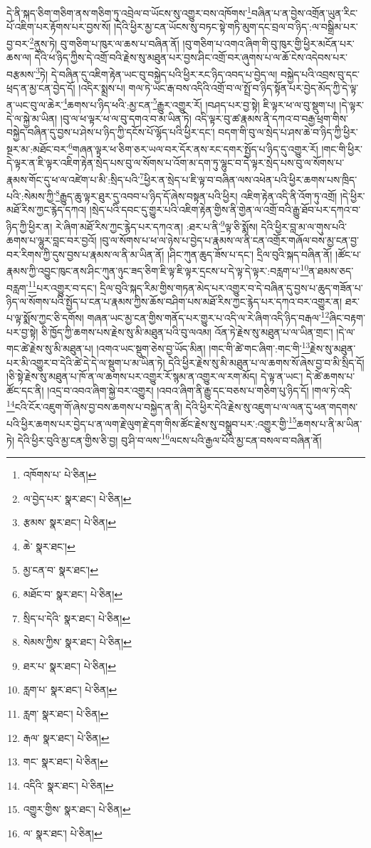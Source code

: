 དེ་ནི་སྐད་ཅིག་གཅིག་ནས་གཅིག་ཏུ་འབྲེལ་བ་ཡོངས་སུ་འགྱུར་བས་འཁོགས་\footnote{འཁོགས་པ་  པེ་ཅིན། }བཞིན་པ་ན་བྱེས་འགྲོན་ཡུན་རིང་པོ་འཇིག་པར་རྟོགས་པར་བྱས་སོ། །དེའི་ཕྱིར་མྱ་ངན་ཡོངས་སུ་བཏང་སྟེ་གཏི་མུག་དང་བྲལ་བ་ཉིད་:ལ་བསྒྲིམ་པར་བྱ་བར་\footnote{ལ་བྱེད་པར་  སྣར་ཐང་།  པེ་ཅིན། }ནུས་ཏེ། བུ་གཅིག་པ་ཁུར་ལ་ཆས་པ་བཞིན་ནོ། །བུ་གཅིག་པ་འགའ་ཞིག་གི་བུ་ཁུར་གྱི་ཕྱིར་མངོན་པར་ཆས་ལ། དེའི་ཕ་ཉིད་ཀྱིས་དེ་འགྲོ་བའི་རྗེས་སུ་མཐུན་པར་བྱས་ཤིང་འགྲོ་བར་ཞུགས་པ་ལ་ཆོ་ངེས་འདེབས་པར་བརྩམས་\footnote{རྩམས་  སྣར་ཐང་།  པེ་ཅིན། }ཏེ། དེ་བཞིན་དུ་འཇིག་རྟེན་ཡང་བུ་བསྐྱེད་པའི་ཕྱིར་རང་ཉིད་འབད་པ་བྱེད་ལ། བསྐྱེད་པའི་འབྲས་བུ་དང་ཕྲད་ན་མྱ་ངན་བྱེད་དོ། །འདིར་སྨྲས་པ། གལ་ཏེ་ཡང་རྒ་བས་འདིའི་འགྲོ་བ་ལ་སྤྲོ་བ་ཉིད་སྟོན་པར་བྱེད་མོད་ཀྱི་དེ་ལྟ་ན་ཡང་བུ་ལ་ཆེར་\footnote{ཆེ་  སྣར་ཐང་། }ཆགས་པ་ཉིད་ཕའི་:མྱ་ངན་\footnote{མྱ་ངན་བ་  སྣར་ཐང་། }རྒྱུར་འགྱུར་རོ། །བཤད་པར་བྱ་སྟེ། ཇི་ལྟར་ཕ་ལ་བུ་སྡུག་པ། །དེ་ལྟར་དེ་ལ་སྐྱེ་མ་ཡིན། །བུ་ལ་ཕ་ལྟར་ཕ་ལ་བུ་དགའ་བ་མ་ཡིན་ཏེ། འདི་ལྟར་བུ་ཚ་རྣམས་ནི་དཀའ་བ་བརྒྱ་ཕྲག་གིས་བསྐྱེད་བཞིན་དུ་བྱས་པ་ཤེས་པ་ཉིད་ཀྱི་དངོས་པོ་ལྷོད་པའི་ཕྱིར་དང་། བདག་གི་བུ་ལ་སྲེད་པ་ཤས་ཆེ་བ་ཉིད་ཀྱི་ཕྱིར་སྔར་མ་:མཐོང་བར་\footnote{མཐོང་བ་  སྣར་ཐང་།  པེ་ཅིན། }གཞན་ལྟར་ཕ་ཅིག་ཅར་ཡལ་བར་དོར་ནས་རང་དགར་སྤྱོད་པ་ཉིད་དུ་འགྱུར་རོ། །གང་གི་ཕྱིར་དེ་ལྟར་ན་ཇི་ལྟར་འཇིག་རྟེན་སྲེད་པས་བུ་ལ་སོགས་པ་འོག་མ་དག་ཏུ་ལྷུང་བ་དེ་ལྟར་སྲེད་པས་བུ་ལ་སོགས་པ་རྣམས་གོང་དུ་ཕ་ལ་འཛེག་པ་མི་:སྲིད་པའི་\footnote{སྲིད་པ་དེའི་  སྣར་ཐང་།  པེ་ཅིན། }ཕྱིར་ན་སྲེད་པ་ཇི་ལྟ་བ་བཞིན་ལས་འཕེན་པའི་ཕྱིར་ཆགས་པས་ཁྲིད་པའི་:སེམས་ཀྱི་\footnote{སེམས་ཀྱིས་  སྣར་ཐང་།  པེ་ཅིན། }རྒྱུད་ཆུ་ལྟར་ཐུར་དུ་འབབ་པ་ཉིད་དོ་ཞེས་བསྟན་པའི་ཕྱིར། འཇིག་རྟེན་འདི་ནི་འོག་ཏུ་འགྲོ། །དེ་ཕྱིར་མཐོ་རིས་ཀྱང་རྙེད་དཀའ། །སྲེད་པའི་དབང་དུ་གྱུར་པའི་འཇིག་རྟེན་གྱིས་ནི་གྱེན་ལ་འགྲོ་བའི་རྒྱུ་ཐོབ་པར་དཀའ་བ་ཉིད་ཀྱི་ཕྱིར་ན། རེ་ཞིག་མཐོ་རིས་ཀྱང་རྙེད་པར་དཀའ་ན། :ཐར་པ་ནི་\footnote{ཐར་པ་  སྣར་ཐང་།  པེ་ཅིན། }ལྟ་ཅི་སྨོས། དེའི་ཕྱིར་བླ་མ་ལ་གུས་པའི་ཆགས་པ་ལྷུར་བླང་བར་བྱའོ། །བུ་ལ་སོགས་པ་ཕ་ལ་ཉེས་པ་བྱེད་པ་རྣམས་ལ་ནི་ངན་འགྲོར་གཞོལ་བས་མྱ་ངན་བྱ་བར་རིགས་ཀྱི་དུས་བྱས་པ་རྣམས་ལ་ནི་མ་ཡིན་ནོ། །ཤིང་ཀུན་ཆུད་ཟོས་པ་དང་། དྲིལ་བུའི་སྐད་བཞིན་ནོ། །ཚོང་པ་རྣམས་ཀྱི་འབྱུང་ཁུང་ནས་ཤིང་ཀུན་ཉུང་ཟད་ཅིག་ཇི་ལྟ་ཇི་ལྟར་དྲངས་པ་དེ་ལྟ་དེ་ལྟར་:བརླག་པ་\footnote{རླག་པ་  སྣར་ཐང་།  པེ་ཅིན། }ན་ཐམས་ཅད་བརླག་\footnote{རླག་  སྣར་ཐང་།  པེ་ཅིན། }པར་འགྱུར་བ་དང་། དྲིལ་བུའི་སྐད་རིམ་གྱིས་གཏན་མེད་པར་འགྱུར་བ་དེ་བཞིན་དུ་བྱས་པ་ཆུད་གཟོན་པ་ཉིད་ལ་སོགས་པའི་སྤྱོད་པ་ངན་པ་རྣམས་ཀྱིས་ཆོས་བཤིག་པས་མཐོ་རིས་ཀྱང་རྙེད་པར་དཀའ་བར་འགྱུར་ན། ཐར་པ་ལྟ་སྨོས་ཀྱང་ཅི་དགོས། གཞན་ཡང་མྱ་ངན་གྱིས་གནོད་པར་གྱུར་པ་འདི་ལ་རེ་ཞིག་འདི་ཉིད་བརྒལ་\footnote{རྒལ་  སྣར་ཐང་།  པེ་ཅིན། }ཞིང་བརྟག་པར་བྱ་སྟེ། ཅི་ཁྱོད་ཀྱི་ཆགས་པས་རྗེས་སུ་མི་མཐུན་པའི་བུ་ལའམ། འོན་ཏེ་རྗེས་སུ་མཐུན་པ་ལ་ཡིན་གྲང་། །དེ་ལ་གང་ཚེ་རྗེས་སུ་མི་མཐུན་པ། །འགའ་ཡང་སྡུག་ཅེས་བྱ་ཡོད་མིན། །གང་གི་ཚེ་གང་ཞིག་:གང་གི་\footnote{གང་  སྣར་ཐང་།  པེ་ཅིན། }རྗེས་སུ་མཐུན་པར་མི་འགྱུར་བ་དེའི་ཚེ་དེ་དེ་ལ་སྡུག་པ་མ་ཡིན་ཏེ། དེའི་ཕྱིར་རྗེས་སུ་མི་མཐུན་པ་ལ་ཆགས་སོ་ཞེས་བྱ་བ་མི་སྲིད་དོ། །ཅི་སྟེ་རྗེས་སུ་མཐུན་པ་ཁོ་ན་ལ་ཆགས་པར་འགྱུར་རོ་སྙམ་ན་འགྱུར་ལ་རག་མོད། དེ་ལྟ་ན་ཡང་། དེ་ཚེ་ཆགས་པ་ཚོང་དང་ནི། །འདྲ་བ་འབའ་ཞིག་སྐྱེ་བར་འགྱུར། །འབའ་ཞིག་ནི་རྒྱུ་དང་བཅས་པ་གཅིག་པུ་ཉིད་དོ། །གལ་ཏེ་འདི་\footnote{འདིའི་  སྣར་ཐང་།  པེ་ཅིན། }ངའི་ངོར་འཇུག་གོ་ཞེས་བྱ་བས་ཆགས་པ་བསྐྱེད་ན་ནི། དེའི་ཕྱིར་དེའི་རྗེས་སུ་འཇུག་པ་ལ་ལན་དུ་ཕན་གདགས་པའི་ཕྱིར་ཆགས་པར་བྱེད་པ་ན་ལག་རྗེ་ལུག་རྗེ་དག་གིས་ཚོང་རྗེས་སུ་བསྒྲུབ་པར་:འགྱུར་གྱི་\footnote{འགྱུར་གྱིས་  སྣར་ཐང་།  པེ་ཅིན། }ཆགས་པ་ནི་མ་ཡིན་ཏེ། དེའི་ཕྱིར་བུའི་མྱ་ངན་གྱིས་ཅི་བྱ། བུ་ཤི་བ་ལས་\footnote{ལ་  སྣར་ཐང་།  པེ་ཅིན། }ལངས་པའི་རྒྱལ་པོའི་མྱ་ངན་བསལ་བ་བཞིན་ནོ། 